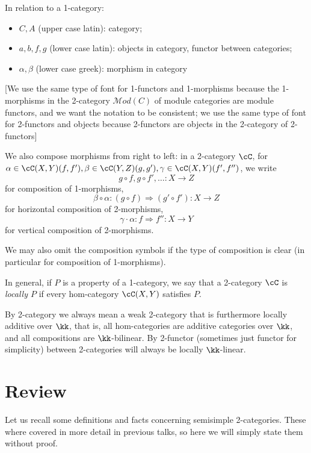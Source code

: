\documentclass[12pt]{article}
\newcommand{\Mod}{{\mathcal{M}od}}
\begin{document}
In relation to a 1-category:
\begin{itemize}
\item $C,A$ (upper case latin): category;

\item $a,b,f,g$ (lower case latin): objects in category,
	functor between categories;

\item $\alpha,\beta$ (lower case greek): morphism in category
\end{itemize}

[We use the same type of font for 1-functors and 1-morphisms
because the 1-morphisms in the 2-category $\Mod(C)$
of module categories are module functors,
and we want the notation to be consistent;
we use the same type of font for 2-functors and objects
because 2-functors are objects in the 2-category of
2-functors]

We also compose morphisms from right to left:
in a 2-category $\cC$,
for $\alpha \in \cC(X,Y)(f,f'),
\beta \in \cC(Y,Z)(g,g'),
\gamma \in \cC(X,Y)(f',f'')$,
we write
\[
g \circ f, g \circ f', \ldots : X \to Z
\]
for composition of 1-morphisms,
\[
\beta \circ \alpha: (g \circ f) \Rightarrow (g' \circ f'):
	X \to Z
\]
for horizontal composition of 2-morphisms,
\[
\gamma \cdot \alpha: f \Rightarrow f'' : X \to Y
\]
for vertical composition of 2-morphisms.


We may also omit the composition symbols
if the type of composition is clear
(in particular for composition of 1-morphisms).



In general, if $P$ is a property of a 1-category,
we say that a 2-category $\cC$ is \emph{locally $P$}
if every hom-category $\cC(X,Y)$ satisfies $P$.

By 2-category we always mean a weak 2-category
that is furthermore locally additive over $\kk$,
that is, all hom-categories are
additive categories over $\kk$,
and all compositions are $\kk$-bilinear.
By 2-functor (sometimes just functor for simplicity)
between 2-categories will always be locally $\kk$-linear.


\section{Review}

Let us recall some definitions and facts concerning
semisimple 2-categories.
These where covered in more detail in previous talks,
so here we will simply state them without proof.
\end{document}
